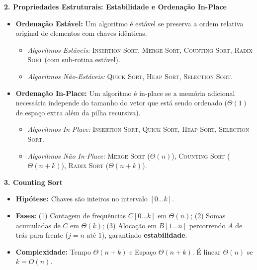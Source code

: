 \documentclass[11pt,a4paper]{article}
\newcommand{\topico}[1]{\par\medskip\textbf{\color{azul}#1}\par}
\begin{document}
\topico{2. Propriedades Estruturais: Estabilidade e Ordenação In-Place}
\begin{itemize}
  \item \textbf{Ordenação Estável:} Um algoritmo é estável se preserva a ordem relativa original de elementos com chaves idênticas.
  \begin{itemize}
    \item \textit{Algoritmos Estáveis:} \textsc{Insertion Sort}, \textsc{Merge Sort}, \textsc{Counting Sort}, \textsc{Radix Sort} (com sub-rotina estável).
    \item \textit{Algoritmos Não-Estáveis:} \textsc{Quick Sort}, \textsc{Heap Sort}, \textsc{Selection Sort}.
  \end{itemize}
  \item \textbf{Ordenação In-Place:} Um algoritmo é in-place se a memória adicional necessária independe do tamanho do vetor que está sendo ordenado ($\Theta(1)$ de espaço extra além da pilha recursiva).
  \begin{itemize}
    \item \textit{Algoritmos In-Place:} \textsc{Insertion Sort}, \textsc{Quick Sort}, \textsc{Heap Sort}, \textsc{Selection Sort}.
    \item \textit{Algoritmos Não In-Place:} \textsc{Merge Sort} ($\Theta(n)$), \textsc{Counting Sort} ($\Theta(n+k)$), \textsc{Radix Sort} ($\Theta(n+k)$).
  \end{itemize}
\end{itemize}

\topico{3. Counting Sort}
\begin{itemize}
  \item \textbf{Hipótese:} Chaves são inteiros no intervalo $[0 \dots k]$.
  \item \textbf{Fases:} (1) Contagem de frequências $C[0 \dots k]$ em $\Theta(n)$; (2) Somas acumuladas de $C$ em $\Theta(k)$; (3) Alocação em $B[1 \dots n]$ percorrendo $A$ de trás para frente ($j = n \text{ até } 1$), garantindo \textbf{estabilidade}.
  \item \textbf{Complexidade:} Tempo $\Theta(n + k)$ e Espaço $\Theta(n + k)$. É linear $\Theta(n)$ se $k = O(n)$.
\end{itemize}
\end{document}
